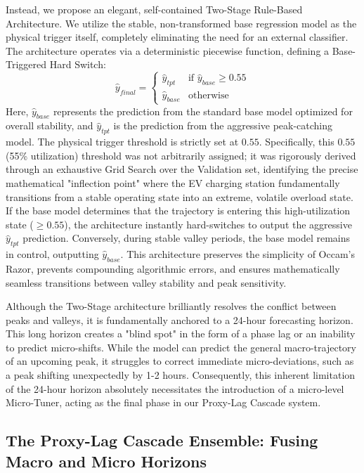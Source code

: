 \documentclass[pdflatex,sn-mathphys-num]{sn-jnl}%
\theoremstyle{thmstyleone}%
\theoremstyle{thmstyletwo}%
\theoremstyle{thmstylethree}%
\begin{document}
Instead, we propose an elegant, self-contained Two-Stage Rule-Based Architecture. We utilize the stable, non-transformed base regression model as the physical trigger itself, completely eliminating the need for an external classifier. The architecture operates via a deterministic piecewise function, defining a Base-Triggered Hard Switch:
\begin{equation}
\hat{y}_{final} = 
\begin{cases} 
\hat{y}_{tpt} & \text{if } \hat{y}_{base} \ge 0.55 \\ 
\hat{y}_{base} & \text{otherwise} 
\end{cases}
\end{equation}
Here, $\hat{y}_{base}$ represents the prediction from the standard base model optimized for overall stability, and $\hat{y}_{tpt}$ is the prediction from the aggressive peak-catching model. The physical trigger threshold is strictly set at $0.55$. Specifically, this $0.55$ (55\% utilization) threshold was not arbitrarily assigned; it was rigorously derived through an exhaustive Grid Search over the Validation set, identifying the precise mathematical "inflection point" where the EV charging station fundamentally transitions from a stable operating state into an extreme, volatile overload state. If the base model determines that the trajectory is entering this high-utilization state ($\ge 0.55$), the architecture instantly hard-switches to output the aggressive $\hat{y}_{tpt}$ prediction. Conversely, during stable valley periods, the base model remains in control, outputting $\hat{y}_{base}$. This architecture preserves the simplicity of Occam's Razor, prevents compounding algorithmic errors, and ensures mathematically seamless transitions between valley stability and peak sensitivity.

Although the Two-Stage architecture brilliantly resolves the conflict between peaks and valleys, it is fundamentally anchored to a 24-hour forecasting horizon. This long horizon creates a "blind spot" in the form of a phase lag or an inability to predict micro-shifts. While the model can predict the general macro-trajectory of an upcoming peak, it struggles to correct immediate micro-deviations, such as a peak shifting unexpectedly by 1-2 hours. Consequently, this inherent limitation of the 24-hour horizon absolutely necessitates the introduction of a micro-level Micro-Tuner, acting as the final phase in our Proxy-Lag Cascade system.

\subsection{The Proxy-Lag Cascade Ensemble: Fusing Macro and Micro Horizons}\label{subsec2_5}
\end{document}
